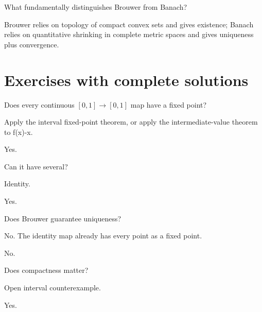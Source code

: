 \begin{problem}\label{prob:ii17-problem-12}
What fundamentally distinguishes Brouwer from Banach?
\end{problem}
\begin{solution}
Brouwer relies on topology of compact convex sets and gives existence; Banach relies on quantitative shrinking in complete metric spaces and gives uniqueness plus convergence.
\end{solution}

\section{Exercises with complete solutions}

\begin{exercise}\label{exr:ii17-01}
Does every continuous $[0,1]\to[0,1]$ map have a fixed point?
\end{exercise}
\begin{hint}
Apply the interval fixed-point theorem, or apply the intermediate-value theorem to f(x)-x.
\end{hint}
\begin{solution}
Yes.
\end{solution}

\begin{exercise}\label{exr:ii17-02}
Can it have several?
\end{exercise}
\begin{hint}
Identity.
\end{hint}
\begin{solution}
Yes.
\end{solution}

\begin{exercise}\label{exr:ii17-03}
Does Brouwer guarantee uniqueness?
\end{exercise}
\begin{hint}
No. The identity map already has every point as a fixed point.
\end{hint}
\begin{solution}
No.
\end{solution}

\begin{exercise}\label{exr:ii17-04}
Does compactness matter?
\end{exercise}
\begin{hint}
Open interval counterexample.
\end{hint}
\begin{solution}
Yes.
\end{solution}

